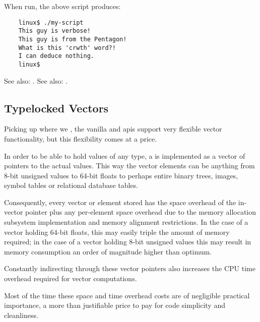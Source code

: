 When run, the above script produces:

\begin{verbatim}
    linux$ ./my-script
    This guy is verbose!
    This guy is from the Pentagon!
    What is this 'crwth' word?!
    I can deduce nothing.
    linux$
\end{verbatim}


See also: .\newline
See also: .

\cutend*

\subsection{Typelocked Vectors}
\label{section:tut:full-monte:typelocked-vectors}

Picking up where we , 
the vanilla  and  
apis support very flexible vector functionality, but this flexibility comes at 
a price.

In order to be able to hold values of any type, a  
is implemented as a vector of pointers to the actual values.  This way the vector 
elements can be anything from 8-bit unsigned values to 64-bit floats to perhaps 
entire binary trees, images, symbol tables or relational database tables.

Consequently, every vector  or  
element stored has the space overhead of the in-vector pointer plus any per-element space 
overhead due to the memory allocation subsystem implementation and memory alignment restrictions. 
In the case of a vector holding 64-bit floats, this may easily triple the amount of memory 
required;  in the case of a vector holding 8-bit unsigned values this may result in memory 
consumption an order of magnitude higher than optimum.

Constantly indirecting through these vector pointers also increases the CPU time overhead 
required for vector computations.

Most of the time these space and time overhead costs are of negligible practical importance, 
a more than justifiable price to pay for code simplicity and cleanliness.

